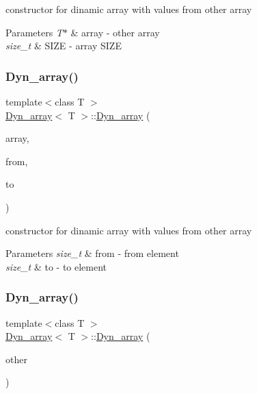 constructor for dinamic array with values from other array 


\begin{DoxyParams}{Parameters}
{\em T$\ast$} & array -\/ other array \\
\hline
{\em size\+\_\+t} & S\+I\+ZE -\/ array S\+I\+ZE \\
\hline
\end{DoxyParams}
\mbox{\label{classDyn__array_a7fa28275bd20add3643eeab60e06a431}} 
\subsubsection{\texorpdfstring{Dyn\+\_\+array()}{Dyn\_array()}\hspace{0.1cm}{\footnotesize\ttfamily [5/6]}}
{\footnotesize\ttfamily template$<$class T $>$ \\
\hyperlink{classDyn__array}{Dyn\+\_\+array}$<$ T $>$\+::\hyperlink{classDyn__array}{Dyn\+\_\+array} (\begin{DoxyParamCaption}\item[{const T $\ast$}]{array,  }\item[{size\+\_\+t}]{from,  }\item[{const size\+\_\+t}]{to }\end{DoxyParamCaption})}



constructor for dinamic array with values from other array 


\begin{DoxyParams}{Parameters}
{\em size\+\_\+t} & from -\/ from element \\
\hline
{\em size\+\_\+t} & to -\/ to element \\
\hline
\end{DoxyParams}
\mbox{\label{classDyn__array_a83d19f61fc7cef07e8125911729fd3bf}} 
\subsubsection{\texorpdfstring{Dyn\+\_\+array()}{Dyn\_array()}\hspace{0.1cm}{\footnotesize\ttfamily [6/6]}}
{\footnotesize\ttfamily template$<$class T $>$ \\
\hyperlink{classDyn__array}{Dyn\+\_\+array}$<$ T $>$\+::\hyperlink{classDyn__array}{Dyn\+\_\+array} (\begin{DoxyParamCaption}\item[{const \hyperlink{classDyn__array}{Dyn\+\_\+array}$<$ T $>$ \&}]{other }\end{DoxyParamCaption})}



